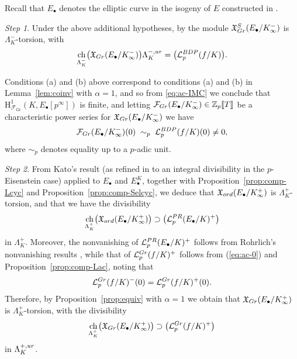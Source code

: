 \documentclass[a4paper,10pt]{amsart}
\numberwithin{equation}{section}
\numberwithin{equation}{section}
\theoremstyle{plain}
\theoremstyle{definition}
\theoremstyle{definition}
\theoremstyle{plain}
\theoremstyle{plain}
\theoremstyle{plain}
\theoremstyle{plain}
\newcommand{\Z}{\mathbb{Z}}
\newcommand{\X}{\mathfrak{X}}
\newcommand{\sk}{\vspace{0.1in}}
\DeclareMathOperator{\ch}{ch}
\DeclareMathOperator{\Gr}{Gr}
\newcommand{\Lcal}{\mathcal{L}}
\newcommand{\Fcal}{\mathcal{F}}
\newcommand{\rH}{\mathrm{H}}
\begin{document}
Recall that $E_\bullet$ denotes the elliptic curve in the isogeny of $E$ constructed in \cite{wuthrich-int}. 
\sk

\noindent\emph{Step 1}. Under the above additional hypotheses, by  \cite[Thm.~C]{eisenstein} the module $\X_{\rm Gr}^S(E_\bullet/K_\infty^-)$ is $\Lambda^-_K$-torsion, with 
\begin{equation}\label{eq:ac-IMC}
\ch_{\Lambda^-_K}\bigl(\X_{\rm Gr}(E_\bullet/K_\infty^-)\bigr)\Lambda_K^{-,\rm ur}=\bigl(\Lcal_p^{{\rm BDP}}(f/K)\bigr).%
\end{equation}

Conditions (a) and (b) above correspond to conditions (a) and (b) in Lemma~\ref{lem:coinv} with $\alpha=1$, and so from \eqref{eq:ac-IMC} we conclude that $\rH^1_{\Fcal_{\Gr}}(K,E_\bullet[p^\infty])$ is finite, and letting $\Fcal_{\rm Gr}(E_\bullet/K_\infty^-)\in\Z_p\llbracket{T}\rrbracket$  be a characteristic power series for $\X_{\rm Gr}(E_\bullet/K_\infty^-)$ we have
\begin{equation}\label{eq:ac-0}
\Fcal_{\rm Gr}(E_\bullet/K_\infty^-)(0)\;\sim_p\;\Lcal_p^{\rm BDP}(f/K)(0)\neq 0,%
\end{equation}
where $\sim_p$ denotes equality up to a $p$-adic unit.
\sk

\noindent\emph{Step 2}. From Kato's result \cite[Thm.~17.4]{kato-euler-systems} (as refined in \cite[Thm.~16]{wuthrich-int} to an integral divisibility in the $p$-Eisenstein case) applied to $E_\bullet$ and $E_\bullet^K$, together with Proposition~\ref{prop:comp-Lcyc} and Proposition~\ref{prop:comp-Selcyc}, we deduce that $\X_{\rm ord}(E_\bullet/K_\infty^+)$ is $\Lambda_K^+$-torsion, and that we have the divisibility
\begin{equation}\label{eq:cyc-ord}
\ch_{\Lambda_K^+}\bigl(\X_{\rm ord}(E_\bullet/K_\infty^+)\bigr)\supset\bigl(\Lcal_p^{\rm PR}(E_\bullet/K)^{+}\bigr)%
\end{equation}
in $\Lambda_K^+$. Moreover, the nonvanishing of $\Lcal_p^{\rm PR}(E_\bullet/K)^+$ follows from Rohrlich's nonvanishing results \cite{rohrlich-cyc}, while that of $\Lcal_p^{\rm Gr}(f/K)^+$ follows from (\ref{eq:ac-0}) and Proposition~\ref{prop:comp-Lac}, noting that 
\[
\Lcal_p^{\rm Gr}(f/K)^-(0)=\Lcal_p^{\rm Gr}(f/K)^+(0).
\] 
Therefore, by Proposition~\ref{prop:equiv} with $\alpha=1$ we obtain that $\X_{\rm Gr}(E_\bullet/K_\infty^+)$ is $\Lambda_K^+$-torsion, with the divisibility 
\begin{equation}\label{eq:cyc-Gr}
\ch_{\Lambda_K^+}\bigl(\X_{\rm Gr}(E_\bullet/K_\infty^+)\bigr)\supset\bigl(\Lcal_p^{\rm Gr}(f/K)^{+}\bigr)%
\end{equation}
in $\Lambda_K^{+,\rm ur}$.
\sk
\end{document}
